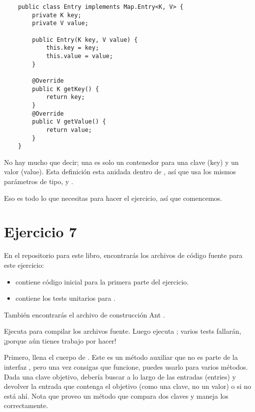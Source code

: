 \documentclass[12pt]{book}
\theoremstyle{exercise}
\begin{document}
\begin{verbatim}
    public class Entry implements Map.Entry<K, V> {
        private K key;
        private V value;
        
        public Entry(K key, V value) {
            this.key = key;
            this.value = value;
        }
        
        @Override
        public K getKey() {
            return key;
        }
        @Override
        public V getValue() {
            return value;
        }
    }
\end{verbatim}

No hay mucho que decir; una  es solo un contenedor para una clave (key)
y un valor (value). Esta definición esta anidada dentro de , así
que usa los mismos parámetros de tipo,  y .


Eso es todo lo que necesitas para hacer el ejercicio, así que comencemos.


\section{Ejercicio 7}
\label{exercise7}

En el repositorio para este libro, encontrarás
los archivos de código fuente para este ejercicio:

\begin{itemize}

\item {} contiene código inicial para la primera parte
  del ejercicio.

\item {} contiene los tests unitarios para
  .

\end{itemize}

También encontrarás el archivo de construcción Ant
.


Ejecuta  para compilar los archivos fuente. Luego ejecuta ; varios tests fallarán, ¡porque aún tienes trabajo por hacer!


Primero, llena el cuerpo de . Este es un método auxiliar
que no es parte de la interfaz , pero una vez consigas que
funcione, puedes usarlo para varios métodos. Dada una clave objetivo,
debería buscar a lo largo de las entradas (entries) y devolver la entrada
que contenga el objetivo (como una clave, no un valor) o  si no
está ahí. Nota que proveo un método  que compara
dos claves y maneja los  correctamente.
\end{document}
